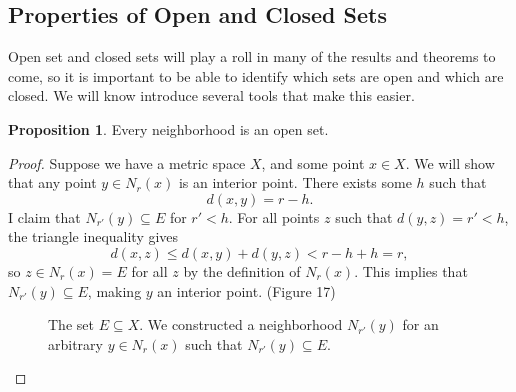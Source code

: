 \documentclass{article}
\theoremstyle{definition}
\newtheorem{proposition}{Proposition}[section]
\begin{document}
	\subsection{Properties of Open and Closed Sets}
	Open set and closed sets will play a roll in many of the results and theorems to come, so it is important to be able to identify which sets are open and which are closed. We will know introduce several tools that make this easier.  
	\begin{proposition}
		Every neighborhood is an open set.
	\end{proposition}
	\begin{proof}
		Suppose we have a metric space $ X $, and some point $ x\in X $. We will show that any point $ y\in N_r(x) $ is an interior point. There exists some $ h $ such that $$d(x,y)=r-h .$$ I claim that $ N_{r'}(y)\subseteq E $ for $ r'<h $. For all points $ z $ such that $ d(y,z)=r'<h $, the triangle inequality gives $$d(x,z)\le d(x,y)+d(y,z)<r-h+h=r, $$ so $ z\in N_r(x)=E $ for all $ z $ by the definition of $ N_r(x) $. This implies that $ N_{r'}(y)\subseteq E $, making $ y $ an interior point. (Figure 17)
		\begin{figure}[h]
			\centering
			\caption{The set $ E\subseteq X $. We constructed a neighborhood $ N_{r'}(y) $ for an arbitrary $ y\in N_r(x) $ such that $ N_{r'}(y)\subseteq E $. }
		\end{figure}
	\end{proof}
	
\end{document}
